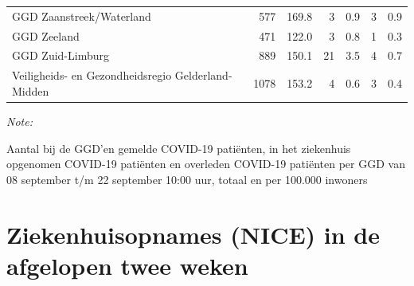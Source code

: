 \documentclass[
  english,
  man,floatsintext]{apa6}
\begin{document}
\begin{table}
\begin{threeparttable}
\begin{tabular}{lrrrrrr}
GGD Zaanstreek/Waterland & 577 & 169.8 & 3 & 0.9 & 3 & 0.9\\
GGD Zeeland & 471 & 122.0 & 3 & 0.8 & 1 & 0.3\\
GGD Zuid-Limburg & 889 & 150.1 & 21 & 3.5 & 4 & 0.7\\
Veiligheids- en Gezondheidsregio Gelderland-Midden & 1078 & 153.2 & 4 & 0.6 & 3 & 0.4\\
\bottomrule
\end{tabular}
\begin{tablenotes}
\item \textit{Note: } 
\item Aantal bij de GGD’en gemelde COVID-19 patiënten, in het ziekenhuis opgenomen COVID-19 patiënten en overleden COVID-19 patiënten per GGD van 08 september t/m 22 september 10:00 uur, totaal en per 100.000 inwoners
\end{tablenotes}
\end{threeparttable}
\endgroup{}
\end{table}

\newpage

\hypertarget{ziekenhuisopnames-nice-in-de-afgelopen-twee-weken}{%
\section{Ziekenhuisopnames (NICE) in de afgelopen twee weken}\label{ziekenhuisopnames-nice-in-de-afgelopen-twee-weken}}
\end{document}
